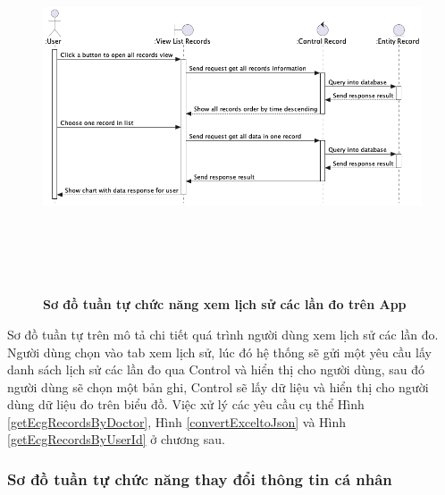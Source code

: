     \begin{figure}[H]
         \centering
         \includegraphics[width=16cm,height=11cm]{Images/mobile_app/view_record_timeline.png}
         \caption[Sơ đồ tuần tự chức năng xem lịch sử các lần đo trên App]{\bfseries \fontsize{12pt}{0pt}
         \selectfont Sơ đồ tuần tự chức năng xem lịch sử các lần đo trên App}
         \label{view_record_timeline} %
    \end{figure}

    Sơ đồ tuần tự trên mô tả chi tiết quá trình người dùng xem lịch sử các lần đo. Người dùng chọn vào tab xem lịch sử, 
    lúc đó hệ thống sẽ gửi một yêu cầu lấy danh sách lịch sử các lần đo qua Control và hiển thị cho người dùng, sau đó người dùng sẽ
    chọn một bản ghi, Control sẽ lấy dữ liệu và hiển thị cho người dùng dữ liệu đo trên biểu đồ. Việc xử lý các yêu cầu cụ thể
    Hình \ref{getEcgRecordsByDoctor}, Hình \ref{convertExceltoJson} và Hình \ref{getEcgRecordsByUserId} ở chương sau.

\subsubsection{Sơ đồ tuần tự chức năng thay đổi thông tin cá nhân}
\mbox{}

